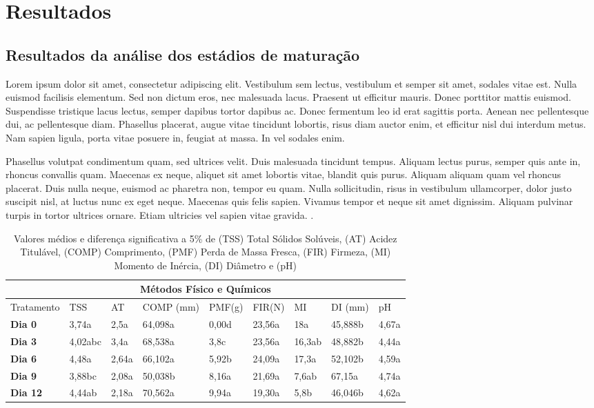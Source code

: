 \chapter{Resultados}

\section{Resultados da análise dos estádios de maturação}
Lorem ipsum dolor sit amet, consectetur adipiscing elit. Vestibulum sem lectus, vestibulum et semper sit amet, sodales vitae est. Nulla euismod facilisis elementum. Sed non dictum eros, nec malesuada lacus. Praesent ut efficitur mauris. Donec porttitor mattis euismod. Suspendisse tristique lacus lectus, semper dapibus tortor dapibus ac. Donec fermentum leo id erat sagittis porta. Aenean nec pellentesque dui, ac pellentesque diam. Phasellus placerat, augue vitae tincidunt lobortis, risus diam auctor enim, et efficitur nisl dui interdum metus. Nam sapien ligula, porta vitae posuere in, feugiat at massa. In vel sodales enim.

Phasellus volutpat condimentum quam, sed ultrices velit. Duis malesuada tincidunt tempus. Aliquam lectus purus, semper quis ante in, rhoncus convallis quam. Maecenas ex neque, aliquet sit amet lobortis vitae, blandit quis purus. Aliquam aliquam quam vel rhoncus placerat. Duis nulla neque, euismod ac pharetra non, tempor eu quam. Nulla sollicitudin, risus in vestibulum ullamcorper, dolor justo suscipit nisl, at luctus nunc ex eget neque. Maecenas quis felis sapien. Vivamus tempor et neque sit amet dignissim. Aliquam pulvinar turpis in tortor ultrices ornare. Etiam ultricies vel sapien vitae gravida.
.

\noindent
\begin{table}[!htb]
\centering
\begin{tabular}{@{}lllllllll@{}}
\toprule
\multicolumn{9}{c}{\textbf{Métodos Físico e Químicos}}                                    \\ \midrule
Tratamento      & TSS     & AT   & COMP (mm) & PMF(g) & FIR(N) & MI     & DI (mm) & pH    \\ \midrule
\textbf{Dia 0}  & 3,74a   & 2,5a & 64,098a   & 0,00d  & 23,56a & 18a    & 45,888b & 4,67a \\ \midrule
\textbf{Dia 3}  & 4,02abc & 3,4a & 68,538a   & 3,8c   & 23,56a & 16,3ab & 48,882b & 4,44a \\ \midrule
\textbf{Dia 6}  & 4,48a & 2,64a & 66,102a &	5,92b &	24,09a & 17,3a & 52,102b & 4,59a \\ \midrule
\textbf{Dia 9}   & 3,88bc & 2,08a & 50,038b & 8,16a & 21,69a & 7,6ab & 67,15a & 4,74a \\ \midrule
\textbf{Dia 12}  & 4,44ab & 2,18a & 70,562a & 9,94a & 19,30a & 5,8b & 46,046b & 4,62a \\ \bottomrule
\end{tabular}
\caption{Valores médios e diferença significativa a 5\% de (TSS) Total Sólidos Solúveis, (AT) Acidez Titulável, (COMP) Comprimento, (PMF) Perda de Massa Fresca, (FIR) Firmeza, (MI) Momento de Inércia, (DI) Diâmetro e (pH)}
\label{tab1}
\end{table}



